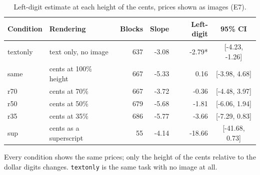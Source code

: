 \begin{table}[t]
\centering
\caption{Left-digit estimate at each height of the cents, prices shown as images (E7).}
\label{tab:vision}
\small
\begin{tabular}{llrrrc}
\toprule
Condition & Rendering & Blocks & Slope & Left-digit & 95\% CI \\
\midrule
textonly & text only, no image & 637 & -3.08 & -2.79* & [-4.23, -1.26] \\
same & cents at 100\% height & 667 & -5.33 & 0.16 & [-3.98, 4.68] \\
r70 & cents at 70\% & 667 & -3.72 & -0.36 & [-4.48, 3.97] \\
r50 & cents at 50\% & 679 & -5.68 & -1.81 & [-6.06, 1.94] \\
r35 & cents at 35\% & 686 & -5.77 & -3.66 & [-7.29, 0.83] \\
sup & cents as a superscript &  55 & -4.14 & -18.66 & [-41.68, 0.73] \\
\bottomrule
\end{tabular}
\vspace{2pt}
\parbox{\linewidth}{\footnotesize Every condition shows the same prices; only the height of the cents relative to the dollar digits changes. \texttt{textonly} is the same task with no image at all.}
\end{table}
